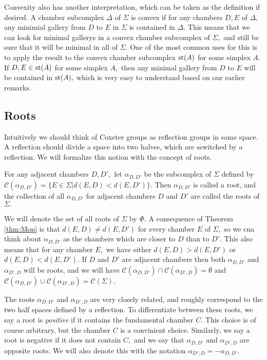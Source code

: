 \documentclass[class=book, crop=false,12 pt]{standalone}
\begin{document}
Convexity also has another interpretation, which can be taken as the definition if desired. A chamber subcomplex $\Delta$ of $\Sigma$ is convex if for any chambers $D,E$ of $\Delta,$ any minimial gallery from $D$ to $E$ in $\Sigma$ is contained in $\Delta.$ This means that we can look for minimal gallerys in a convex chamber subcomplex of $\Sigma,$ and still be sure that it will be minimal in all of $\Sigma.$ One of the most common uses for this is to apply the result to the convex chamber subcomplex $\mathrm{st}(A)$ for some simplex $A.$ If $D,E\in \mathrm{st}(A)$ for some simplex $A,$ then any minimal gallery from $D$ to $E$ will be contained in $\mathrm{st}(A),$ which is very easy to understand based on our earlier remarks.

\subsection{Roots}
Intuitively we should think of Coxeter groups as reflection groups in some space. A reflection should divide a space into two halves, which are sswitched by a reflection. We will formalize this notion with the concept of roots.

\begin{defn}
	\label{defn:root}
	For any adjacent chambers $D,D',$ let $\alpha_{D,D'}$ be the subcomplex of $\Sigma$ defined by $\mathcal{C}(\alpha_{D,D'})=\{E\in \Sigma|d(E,D)<d(E,D')\}.$ Then $\alpha_{D,D'}$ is called a root, and the collection of all $\alpha_{D,D'}$ for adjacent chambers $D$ and $D'$ are called the roots of $\Sigma.$
\end{defn}

We will denote the set of all roots of $\Sigma$ by $\Phi.$ A consequence of Theorem \ref{thm:Mop} is that $d(E,D)\neq d(E,D')$ for every chamber $E$ of $\Sigma,$ so we cna think about $\alpha_{D,D'}$ as the chambers which are closer to $D$ than to $D'.$ This also means that for any chamber $E,$ we have either $d(E,D)>d(E,D')$ or $d(E,D)<d(E,D').$ If $D$ and $D'$ are adjacent chambers then both $\alpha_{D,D'}$ and $\alpha_{D',D}$ will be roots, and we will have $\mathcal{C}(\alpha_{D,D'})\cap \mathcal{C}(\alpha_{D',D})=\emptyset$ and $\mathcal{C}(\alpha_{D,D'})\cup \mathcal{C}(\alpha_{D',D})=\mathcal{C}(\Sigma).$

The roots $\alpha_{D,D'}$ and $\alpha_{D',D}$ are very closely related, and roughly correspond to the two half spaces defined by a reflection. To differentiate between these roots, we say a root is \emph{positive} if it contains the fundamental chamber $C.$ This choice is of course arbitrary, but the chamber $C$ is a convinient choice. Similarly, we say a root is negative if it does not contain $C,$ and we say that $\alpha_{D,D'}$ and $\alpha_{D',D}$ are opposite roots. We will also denote this with the notation $\alpha_{D',D}=-\alpha_{D,D'}.$
\end{document}
